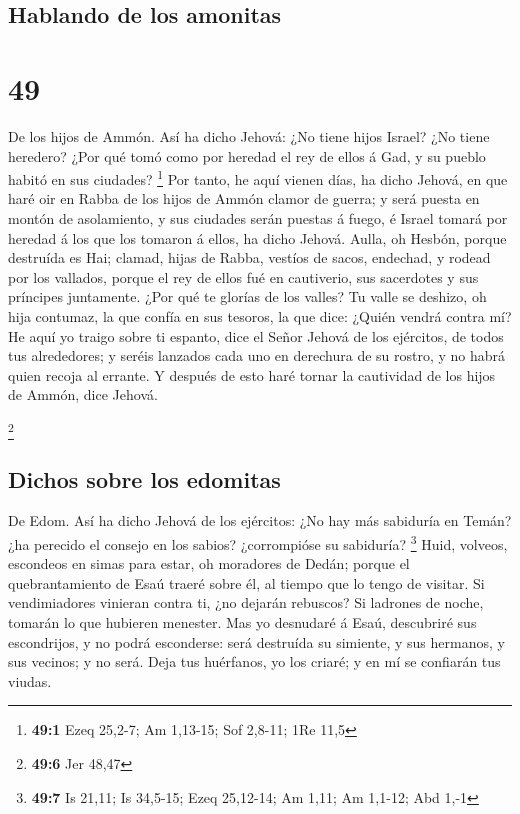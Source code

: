 \hypertarget{hablando-de-los-amonitas}{%
\subsection{Hablando de los amonitas}\label{hablando-de-los-amonitas}}

\hypertarget{section-48}{%
\section{49}\label{section-48}}

 De los hijos de Ammón. Así ha dicho Jehová: ¿No tiene
hijos Israel? ¿No tiene heredero? ¿Por qué tomó como por heredad el rey
de ellos á Gad, y su pueblo habitó en sus ciudades? \footnote{\textbf{49:1}
  Ezeq 25,2-7; Am 1,13-15; Sof 2,8-11; 1Re 11,5}  Por
tanto, he aquí vienen días, ha dicho Jehová, en que haré oir en Rabba de
los hijos de Ammón clamor de guerra; y será puesta en montón de
asolamiento, y sus ciudades serán puestas á fuego, é Israel tomará por
heredad á los que los tomaron á ellos, ha dicho Jehová. 
Aulla, oh Hesbón, porque destruída es Hai; clamad, hijas de Rabba,
vestíos de sacos, endechad, y rodead por los vallados, porque el rey de
ellos fué en cautiverio, sus sacerdotes y sus príncipes juntamente.
 ¿Por qué te glorías de los valles? Tu valle se deshizo,
oh hija contumaz, la que confía en sus tesoros, la que dice: ¿Quién
vendrá contra mí?  He aquí yo traigo sobre ti espanto,
dice el Señor Jehová de los ejércitos, de todos tus alrededores; y
seréis lanzados cada uno en derechura de su rostro, y no habrá quien
recoja al errante.  Y después de esto haré tornar la
cautividad de los hijos de Ammón, dice Jehová.

\footnote{\textbf{49:6} Jer 48,47}

\hypertarget{dichos-sobre-los-edomitas}{%
\subsection{Dichos sobre los edomitas}\label{dichos-sobre-los-edomitas}}

 De Edom. Así ha dicho Jehová de los ejércitos: ¿No hay
más sabiduría en Temán? ¿ha perecido el consejo en los sabios?
¿corrompióse su sabiduría? \footnote{\textbf{49:7} Is 21,11; Is 34,5-15;
  Ezeq 25,12-14; Am 1,11; Am 1,1-12; Abd 1,-1}  Huid,
volveos, escondeos en simas para estar, oh moradores de Dedán; porque el
quebrantamiento de Esaú traeré sobre él, al tiempo que lo tengo de
visitar.  Si vendimiadores vinieran contra ti, ¿no dejarán
rebuscos? Si ladrones de noche, tomarán lo que hubieren menester.
 Mas yo desnudaré á Esaú, descubriré sus escondrijos, y
no podrá esconderse: será destruída su simiente, y sus hermanos, y sus
vecinos; y no será.  Deja tus huérfanos, yo los criaré; y
en mí se confiarán tus viudas.

